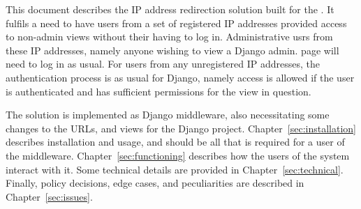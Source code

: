 This document describes the IP address redirection solution built
for the \client. It fulfils a need to have users from a set of
registered IP addresses provided access to non-admin views
without their having to log in. Administrative usrs from these IP
addresses, namely anyone wishing to view a Django admin. page
will need to log in as usual. For users from any unregistered IP
addresses, the authentication process is as usual for Django,
namely access is allowed if the user is authenticated and has
sufficient permissions for the view in question.

The solution is implemented as Django middleware, also
necessitating some changes to the URLs, and views for the Django
project. Chapter~\ref{sec:installation} describes installation
and usage, and should be all that is required for a user of the
middleware. Chapter~\ref{sec:functioning} describes how the users
of the system interact with it. Some technical details are
provided in Chapter~\ref{sec:technical}. Finally, policy
decisions, edge cases, and peculiarities are described in
Chapter~\ref{sec:issues}.
